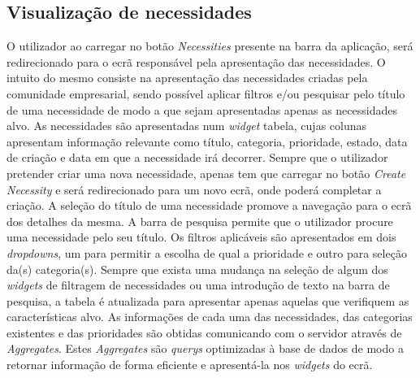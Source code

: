 \subsection{Visualização de necessidades}\label{subsec:implementacao:necessities}
O utilizador ao carregar no botão \textit{Necessities} presente na barra da aplicação, será redirecionado para o ecrã responsável pela apresentação das necessidades. 
O intuito do mesmo consiste na apresentação das necessidades criadas pela comunidade empresarial, sendo possível aplicar filtros e/ou pesquisar pelo título de uma necessidade de modo a que sejam apresentadas apenas as necessidades alvo.
As necessidades são apresentadas num \textit{widget} tabela, cujas colunas apresentam informação relevante como título, categoria, prioridade, estado, data de criação e data em que a necessidade irá decorrer. Sempre que o utilizador pretender criar uma nova necessidade, apenas tem que carregar no botão \textit{Create Necessity} e será redirecionado para um novo ecrã, onde poderá completar a criação.
A seleção do título de uma necessidade promove a navegação para o ecrã dos detalhes da mesma.
A barra de pesquisa permite que o utilizador procure uma necessidade pelo seu título.
Os filtros aplicáveis são apresentados em dois \textit{dropdowns}, um para permitir a escolha de qual a prioridade e outro para seleção da(s) categoria(s).
Sempre que exista uma mudança na seleção de algum dos \textit{widgets} de filtragem de necessidades ou uma introdução de texto na barra de pesquisa, a tabela é atualizada para apresentar apenas aquelas que verifiquem as características alvo. 
As informações de cada uma das necessidades, das categorias existentes e das prioridades são obtidas comunicando com o servidor através de \textit{Aggregates}. 
Estes \textit{Aggregates} são \textit{querys} optimizadas à base de dados de modo a retornar informação de forma eficiente e apresentá-la nos \textit{widgets} do ecrã.



